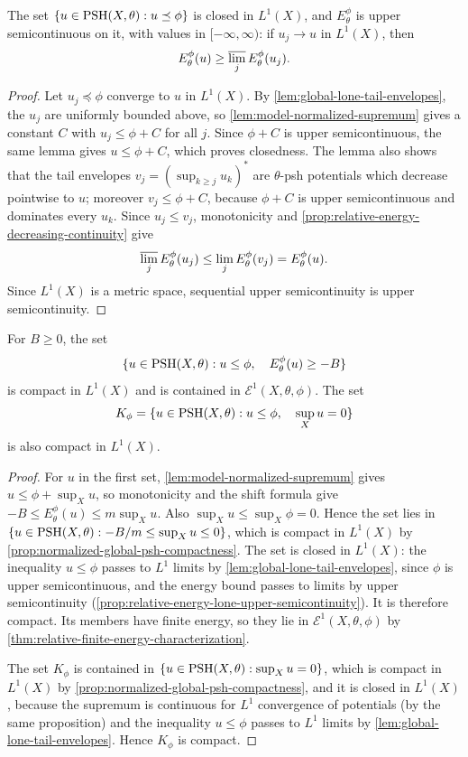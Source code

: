 \begin{proposition}\label{prop:relative-energy-lone-upper-semicontinuity}
The set $\{u\in\mathrm{PSH}(X,\theta):u\preceq\phi\}$ is closed in $L^1(X)$, and $E_\theta^\phi$ is upper semicontinuous on it, with values in $[-\infty,\infty)$: if $u_j\to u$ in $L^1(X)$, then
\[
 E_\theta^\phi(u)\geq\varlimsup_j E_\theta^\phi(u_j).
\]
\end{proposition}
\begin{proof}
Let $u_j\preceq\phi$ converge to $u$ in $L^1(X)$. By \cref{lem:global-lone-tail-envelopes}, the $u_j$ are uniformly bounded above, so \cref{lem:model-normalized-supremum} gives a constant $C$ with $u_j\leq\phi+C$ for all $j$. Since $\phi+C$ is upper semicontinuous, the same lemma gives $u\leq\phi+C$, which proves closedness. The lemma also shows that the tail envelopes $v_j=(\sup_{k\geq j}u_k)^*$ are $\theta$-psh potentials which decrease pointwise to $u$; moreover $v_j\leq\phi+C$, because $\phi+C$ is upper semicontinuous and dominates every $u_k$. Since $u_j\leq v_j$, monotonicity and \cref{prop:relative-energy-decreasing-continuity} give
\[
 \varlimsup_j E_\theta^\phi(u_j)
       \leq\lim_jE_\theta^\phi(v_j)=E_\theta^\phi(u).
\]
Since $L^1(X)$ is a metric space, sequential upper semicontinuity is upper semicontinuity.
\end{proof}

\begin{corollary}\label{cor:relative-energy-compact-sublevels}
For $B\geq0$, the set
\[
 \{u\in\mathrm{PSH}(X,\theta):u\leq\phi,\quad E_\theta^\phi(u)\geq-B\}
\]
is compact in $L^1(X)$ and is contained in $\mathcal E^1(X,\theta,\phi)$. The set
\[
 K_\phi=\{u\in\mathrm{PSH}(X,\theta):u\leq\phi,\quad\sup_Xu=0\}
\]
is also compact in $L^1(X)$.
\end{corollary}
\begin{proof}
For $u$ in the first set, \cref{lem:model-normalized-supremum} gives $u\leq\phi+\sup_Xu$, so monotonicity and the shift formula give $-B\leq E_\theta^\phi(u)\leq m\sup_Xu$. Also $\sup_Xu\leq\sup_X\phi=0$. Hence the set lies in $\{u\in\mathrm{PSH}(X,\theta):-B/m\leq\sup_Xu\leq0\}$, which is compact in $L^1(X)$ by \cref{prop:normalized-global-psh-compactness}. The set is closed in $L^1(X)$: the inequality $u\leq\phi$ passes to $L^1$ limits by \cref{lem:global-lone-tail-envelopes}, since $\phi$ is upper semicontinuous, and the energy bound passes to limits by upper semicontinuity (\cref{prop:relative-energy-lone-upper-semicontinuity}). It is therefore compact. Its members have finite energy, so they lie in $\mathcal E^1(X,\theta,\phi)$ by \cref{thm:relative-finite-energy-characterization}.

The set $K_\phi$ is contained in $\{u\in\mathrm{PSH}(X,\theta):\sup_Xu=0\}$, which is compact in $L^1(X)$ by \cref{prop:normalized-global-psh-compactness}, and it is closed in $L^1(X)$, because the supremum is continuous for $L^1$ convergence of potentials (by the same proposition) and the inequality $u\leq\phi$ passes to $L^1$ limits by \cref{lem:global-lone-tail-envelopes}. Hence $K_\phi$ is compact.
\end{proof}

